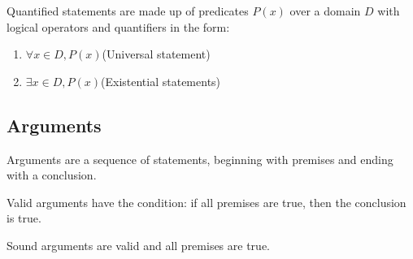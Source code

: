 \documentclass[12pt, a4paper]{article}
\begin{document}
\begin{multicols*}{3}
Quantified statements are made up of predicates $P(x)$ over a domain $D$ with logical operators and quantifiers in the form:
\begin{enumerate}[\roman*.]
  \item $\forall x \in D, P(x)$\hfill(Universal statement)
  \item $\exists x \in D, P(x)$\hfill(Existential statements)
\end{enumerate}

\subsection{Arguments}
Arguments are a sequence of statements, beginning with premises and ending with a conclusion.

Valid arguments have the condition: if all premises are true, then the conclusion is true.

Sound arguments are valid and all premises are true.

\colbreak

\end{multicols*}
\end{document}

